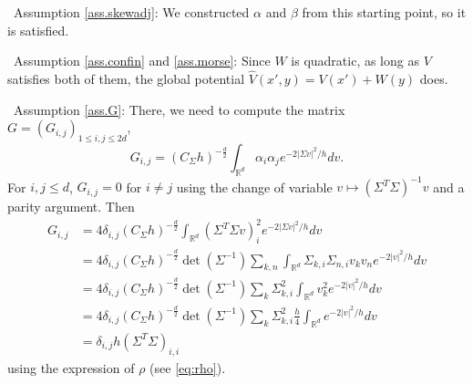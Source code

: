 \documentclass[12pt]{amsart}
\newcommand{\R}{\mathbb R}
\numberwithin{equation}{section}
\numberwithin{figure}{section}
\begin{document}
\textbullet\ Assumption \ref{ass.skewadj}: We constructed $\alpha$ and $\beta$ from this starting point, so it is satisfied.

\textbullet\ Assumption \ref{ass.confin} and \ref{ass.morse}: Since $W$ is quadratic, as long as $V$ satisfies both of them, the global potential $\hat V(x',y) = V(x') + W(y)$ does.

\textbullet\ Assumption \ref{ass.G}: There, we need to compute the matrix $G = (G_{i,j})_{1\leq i,j\leq 2d}$,
\begin{equation*}
G_{i,j} = (C_\Sigma h)^{-\frac d2}\int_{\R^d}\alpha_i\alpha_je^{-2|\Sigma v|^2/h}dv.
\end{equation*}
For $i,j\leq d$, $G_{i,j} = 0$ for $i\neq j$ using the change of variable $v\mapsto(\Sigma^T\Sigma)^{-1} v$ and a parity argument. Then
\begin{equation*}
\begin{aligned}
    G_{i,j} &= 4\delta_{i,j}(C_\Sigma h)^{-\frac d2}\int_{\R^d}(\Sigma^T\Sigma v)_i^2e^{-2|\Sigma v|^2/h}dv\\
    &= 4\delta_{i,j}(C_\Sigma h)^{-\frac d2}\det(\Sigma^{-1})\sum_{k,n}\int_{\R^d}\Sigma_{k,i}\Sigma_{n,i}v_kv_ne^{-2|v|^2/h}dv\\
    &= 4\delta_{i,j}(C_\Sigma h)^{-\frac d2}\det(\Sigma^{-1})\sum_{k}\Sigma_{k,i}^2\int_{\R^d}v_k^2e^{-2|v|^2/h}dv\\
    &= 4\delta_{i,j}(C_\Sigma h)^{-\frac d2}\det(\Sigma^{-1})\sum_{k}\Sigma_{k,i}^2\frac h4\int_{\R^d}e^{-2|v|^2/h}dv\\
    &= \delta_{i,j}h(\Sigma^T\Sigma)_{i,i}
\end{aligned}
\end{equation*}
using the expression of $\rho$ (see \eqref{eq:rho}).
\end{document}
